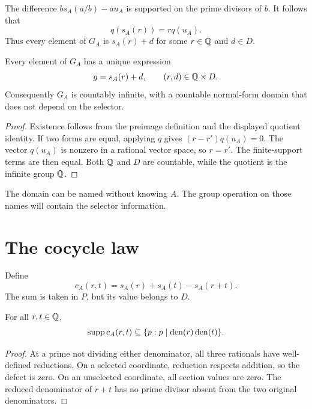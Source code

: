 The difference $b s_A(a/b)-a u_A$ is supported on the prime divisors of $b$. It follows that
\[
q(s_A(r))=r q(u_A).
\]
Thus every element of $G_A$ is $s_A(r)+d$ for some $r\in\mathbb Q$ and $d\in D$.

\begin{theorem}
\label{thm:normalform}
Every element of $G_A$ has a unique expression
\[
g=s_A(r)+d,\qquad (r,d)\in\mathbb Q\times D.
\]
Consequently $G_A$ is countably infinite, with a countable normal-form domain that does not depend on the selector.
\end{theorem}
\begin{proof}
Existence follows from the preimage definition and the displayed quotient identity. If two forms are equal, applying $q$ gives $(r-r')q(u_A)=0$. The vector $q(u_A)$ is nonzero in a rational vector space, so $r=r'$. The finite-support terms are then equal. Both $\mathbb Q$ and $D$ are countable, while the quotient is the infinite group $\mathbb Q$.
\end{proof}
The domain can be named without knowing $A$. The group operation on those names will contain the selector information.

\section{The cocycle law}
Define
\[
c_A(r,t)=s_A(r)+s_A(t)-s_A(r+t).
\]
The sum is taken in $P$, but its value belongs to $D$.

\begin{lemma}
\label{thm:cocyclesupport}
For all $r,t\in\mathbb Q$,
\[
\operatorname{supp} c_A(r,t)\subseteq
\{p:p\mid\operatorname{den}(r)\operatorname{den}(t)\}.
\]
\end{lemma}
\begin{proof}
At a prime not dividing either denominator, all three rationals have well-defined reductions. On a selected coordinate, reduction respects addition, so the defect is zero. On an unselected coordinate, all section values are zero. The reduced denominator of $r+t$ has no prime divisor absent from the two original denominators.
\end{proof}

